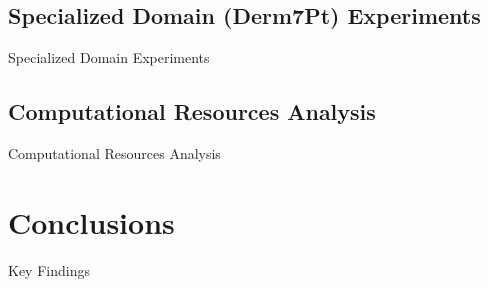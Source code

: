 \documentclass[aspectratio=169]{beamer}
\begin{document}


\subsection{Specialized Domain (Derm7Pt) Experiments}
\begin{frame}{Specialized Domain Experiments}
\end{frame}

\subsection{Computational Resources Analysis}
\begin{frame}{Computational Resources Analysis}
\end{frame}

\section{Conclusions}
\begin{frame}{Key Findings}
\end{frame}
\end{document}
